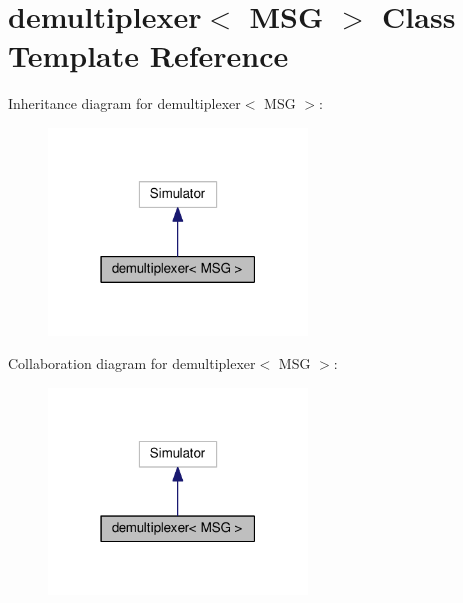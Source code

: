 \hypertarget{classdemultiplexer}{}\section{demultiplexer$<$ M\+SG $>$ Class Template Reference}
\label{classdemultiplexer}


Inheritance diagram for demultiplexer$<$ M\+SG $>$\+:
\nopagebreak
\begin{figure}[H]
\begin{center}
\leavevmode
\includegraphics[width=195pt]{classdemultiplexer__inherit__graph}
\end{center}
\end{figure}


Collaboration diagram for demultiplexer$<$ M\+SG $>$\+:
\nopagebreak
\begin{figure}[H]
\begin{center}
\leavevmode
\includegraphics[width=195pt]{classdemultiplexer__coll__graph}
\end{center}
\end{figure}
